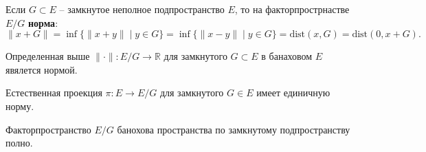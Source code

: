 \begin{to_def}
	Если $G \subset E$ -- замкнутое неполное подпространство $E$, то на факторпрострнастве $E/G$ \textbf{норма}:
	\begin{equation*}
		\|x+G\| = \inf \{\|x+y\| \mid y \in G\} = \inf \{\|x-y\| \mid y \in G\} = \text{dist}(x,G) = \text{dist}(0,x+G).
	\end{equation*}
\end{to_def}
\begin{to_lem}
	Определенная выше $\|\cdot\| \colon E/G \to \mathbb{R}$ для замкнутого $G \subset E$ в банаховом $E$ явялется нормой.
\end{to_lem}

\begin{to_lem}
	Естественная проекция $\pi \colon E \to E/G$ для замкнутого $G \in E$ имеет единичную норму.
\end{to_lem}

\begin{to_lem}
	Факторпространство $E/G$ банохова пространства по замкнутому подпространству полно.
\end{to_lem}